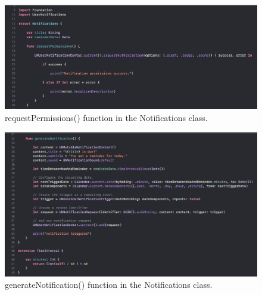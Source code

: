 \begin{figure}[H]
    \centering
    \includegraphics[width=\textwidth]{./graphics/Implementation/Add Item/notifications1.png}
    \caption{requestPermissions() function in the Notifications class.}
    \label{fig:notifications1}
\end{figure}

\begin{figure}[H]
    \centering
    \includegraphics[width=\textwidth]{./graphics/Implementation/Add Item/notifications2.png}
    \caption{generateNotification() function in the Notifications class.}
    \label{fig:notifications2}
\end{figure}